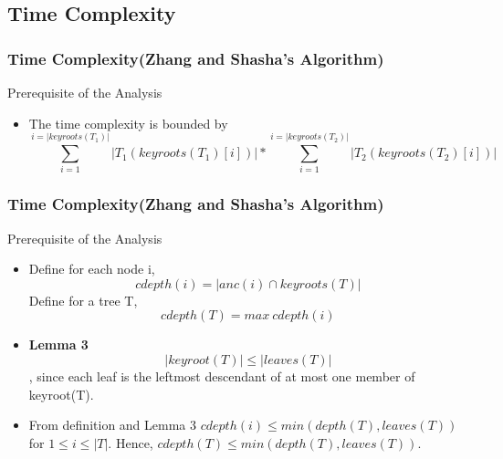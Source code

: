 \documentclass{beamer}
\begin{document}
\subsection{Time Complexity}
\begin{frame}
\frametitle{Time Complexity(Zhang and Shasha's Algorithm)}
\begin{block}{Prerequisite of the Analysis}
\begin{itemize}
\item The time complexity is bounded by 
\begin{displaymath}
\sum_{i=1}^{i=\left\vert keyroots(T_1) \right\vert} \left\vert T_1(keyroots(T_1)[i]) \right\vert * \sum_{i=1}^{i=\left\vert keyroots(T_2) \right\vert} \left\vert T_2(keyroots(T_2)[i]) \right\vert
\end{displaymath}
\end{itemize}
\end{block}
\end{frame}

\begin{frame}
\frametitle{Time Complexity(Zhang and Shasha's Algorithm)}
\begin{block}{Prerequisite of the Analysis}
\begin{itemize}
\item Define for each node i, 
\begin{displaymath}
cdepth(i) = \left\vert anc(i) \cap keyroots(T) \right\vert
\end{displaymath}
Define for a tree T, 
\begin{displaymath}
cdepth(T) = max\ cdepth(i)
\end{displaymath}
\item \textbf{Lemma 3} 
\begin{displaymath}
\left\vert keyroot(T) \right\vert \leq \left\vert leaves(T) \right\vert
\end{displaymath}, since each leaf is the leftmost descendant of at most one member of keyroot(T).
\item From definition and Lemma 3 $cdepth(i) \leq min(depth(T), leaves(T))$ for $1 \leq i \leq \left\vert T \right\vert$. Hence, $cdepth(T) \leq min(depth(T), leaves(T))$.
\end{itemize}
\end{block}
\end{frame}
\end{document}
